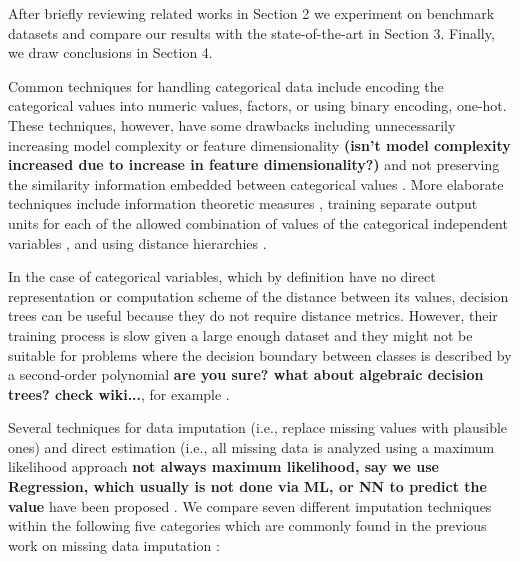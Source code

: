 \documentclass[10pt]{book}
\theoremstyle{definition}
\begin{document}
After briefly reviewing related works in Section 2 we experiment on benchmark datasets and compare our results with the state-of-the-art in Section 3. Finally, we draw conclusions in Section 4.
\par

\lhead[\footnotesize\thepage\fancyplain{}\leftmark]{}\rhead[]{\fancyplain{}\rightmark\footnotesize\thepage}%

\setcounter{chapter}{2}
\setcounter{equation}{0} %

\label{section:encoding}

Common techniques for handling categorical data  include encoding the categorical values into numeric values,
factors, or using binary encoding, one-hot. These techniques, however, have some drawbacks
including unnecessarily increasing model complexity or feature
dimensionality \textbf{(isn't model complexity increased due to increase in feature
dimensionality?)}
and not preserving the similarity information embedded between categorical
values \citep{hsu2006generalizing}. More elaborate techniques include information theoretic measures
\citep{wang2008categorical}, training separate output units for
each of the allowed combination of values of the categorical independent
variables \citep{brouwer2002feed}, and using distance
hierarchies \citep{hsu2006generalizing}. 

In the case of categorical variables, which by definition have no direct
representation or computation scheme of the distance between its values,
decision trees can be useful because they do not require distance metrics.
However, their training process is slow given a large enough dataset and they
might not be suitable for problems where the decision boundary between classes
is described by a second-order polynomial \textbf{are you sure? what about
algebraic decision trees? check wiki...}, for example \citep{fayyad1996data}.

 \label{section:techniques}
Several techniques for data imputation (i.e., replace missing values with plausible ones) and
direct estimation (i.e., all missing data is analyzed using a maximum likelihood
approach \textbf{not always maximum likelihood, say we use Regression, which
usually is not done via ML, or NN to predict the
value} have been proposed \citep{de2003prevention}. We compare seven different imputation techniques within the following five categories which are commonly found in the previous work on missing data imputation \citep{batista2003analysis}:
\end{document}

